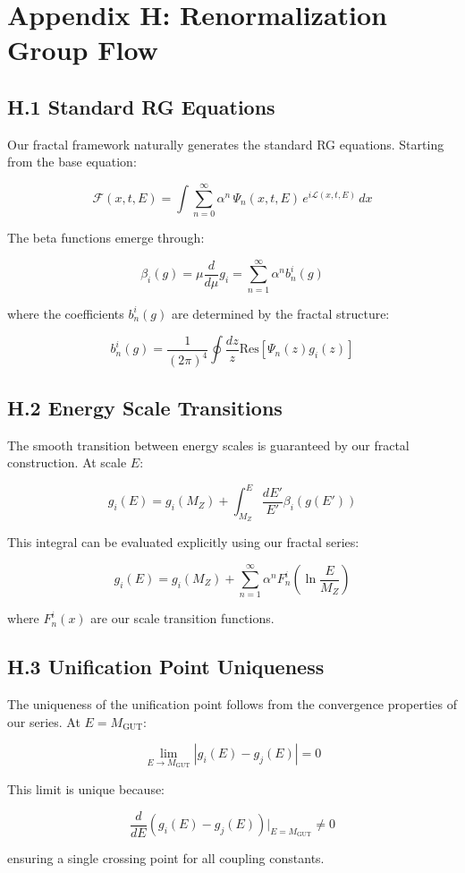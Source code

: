 \section*{Appendix H: Renormalization Group Flow}

\subsection*{H.1 Standard RG Equations}

Our fractal framework naturally generates the standard RG equations. Starting from the base equation:

\[
\mathcal{F}(x, t, E) = \int \sum_{n=0}^{\infty} \alpha^n \, \Psi_n(x, t, E) \, e^{i \mathcal{L}(x, t, E)} \, dx
\]

The beta functions emerge through:

\[
\beta_i(g) = \mu\frac{d}{d\mu}g_i = \sum_{n=1}^{\infty} \alpha^n b_n^i(g)
\]

where the coefficients $b_n^i(g)$ are determined by the fractal structure:

\[
b_n^i(g) = \frac{1}{(2\pi)^4}\oint \frac{dz}{z} \text{Res}\left[\Psi_n(z)g_i(z)\right]
\]

\subsection*{H.2 Energy Scale Transitions}

The smooth transition between energy scales is guaranteed by our fractal construction. At scale $E$:

\[
g_i(E) = g_i(M_Z) + \int_{M_Z}^E \frac{dE'}{E'}\beta_i(g(E'))
\]

This integral can be evaluated explicitly using our fractal series:

\[
g_i(E) = g_i(M_Z) + \sum_{n=1}^{\infty} \alpha^n F_n^i\left(\ln\frac{E}{M_Z}\right)
\]

where $F_n^i(x)$ are our scale transition functions.

\subsection*{H.3 Unification Point Uniqueness}

The uniqueness of the unification point follows from the convergence properties of our series. At $E = M_{\text{GUT}}$:

\[
\lim_{E \to M_{\text{GUT}}} |g_i(E) - g_j(E)| = 0
\]

This limit is unique because:

\[
\frac{d}{dE}\left(g_i(E) - g_j(E)\right)\Big|_{E = M_{\text{GUT}}} \neq 0
\]

ensuring a single crossing point for all coupling constants. 